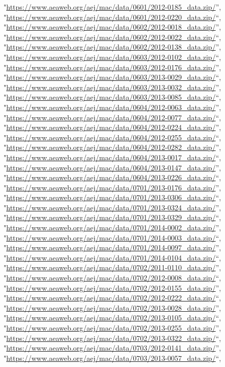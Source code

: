 \documentclass[]{article}
\begin{document}
\begin{itemize}
  "\url{https://www.aeaweb.org/aej/mac/data/0601/2012-0185_data.zip/}'',
  "\url{https://www.aeaweb.org/aej/mac/data/0601/2012-0220_data.zip/}``,
  "\url{https://www.aeaweb.org/aej/mac/data/0602/2012-0018_data.zip/}'',
  "\url{https://www.aeaweb.org/aej/mac/data/0602/2012-0022_data.zip/}``,
  "\url{https://www.aeaweb.org/aej/mac/data/0602/2012-0138_data.zip/}'',
  "\url{https://www.aeaweb.org/aej/mac/data/0603/2012-0102_data.zip/}``,
  "\url{https://www.aeaweb.org/aej/mac/data/0603/2012-0176_data.zip/}'',
  "\url{https://www.aeaweb.org/aej/mac/data/0603/2013-0029_data.zip/}``,
  "\url{https://www.aeaweb.org/aej/mac/data/0603/2013-0032_data.zip/}'',
  "\url{https://www.aeaweb.org/aej/mac/data/0603/2013-0085_data.zip/}``,
  "\url{https://www.aeaweb.org/aej/mac/data/0604/2012-0063_data.zip/}'',
  "\url{https://www.aeaweb.org/aej/mac/data/0604/2012-0077_data.zip/}``,
  "\url{https://www.aeaweb.org/aej/mac/data/0604/2012-0224_data.zip/}'',
  "\url{https://www.aeaweb.org/aej/mac/data/0604/2012-0255_data.zip/}``,
  "\url{https://www.aeaweb.org/aej/mac/data/0604/2012-0282_data.zip/}'',
  "\url{https://www.aeaweb.org/aej/mac/data/0604/2013-0017_data.zip/}``,
  "\url{https://www.aeaweb.org/aej/mac/data/0604/2013-0147_data.zip/}'',
  "\url{https://www.aeaweb.org/aej/mac/data/0604/2013-0226_data.zip/}``,
  "\url{https://www.aeaweb.org/aej/mac/data/0701/2013-0176_data.zip/}'',
  "\url{https://www.aeaweb.org/aej/mac/data/0701/2013-0306_data.zip/}``,
  "\url{https://www.aeaweb.org/aej/mac/data/0701/2013-0324_data.zip/}'',
  "\url{https://www.aeaweb.org/aej/mac/data/0701/2013-0329_data.zip/}``,
  "\url{https://www.aeaweb.org/aej/mac/data/0701/2014-0002_data.zip/}'',
  "\url{https://www.aeaweb.org/aej/mac/data/0701/2014-0003_data.zip/}``,
  "\url{https://www.aeaweb.org/aej/mac/data/0701/2014-0097_data.zip/}'',
  "\url{https://www.aeaweb.org/aej/mac/data/0701/2014-0104_data.zip/}``,
  "\url{https://www.aeaweb.org/aej/mac/data/0702/2011-0110_data.zip/}'',
  "\url{https://www.aeaweb.org/aej/mac/data/0702/2012-0008_data.zip/}``,
  "\url{https://www.aeaweb.org/aej/mac/data/0702/2012-0155_data.zip/}'',
  "\url{https://www.aeaweb.org/aej/mac/data/0702/2012-0222_data.zip/}``,
  "\url{https://www.aeaweb.org/aej/mac/data/0702/2013-0028_data.zip/}'',
  "\url{https://www.aeaweb.org/aej/mac/data/0702/2013-0105_data.zip/}``,
  "\url{https://www.aeaweb.org/aej/mac/data/0702/2013-0255_data.zip/}'',
  "\url{https://www.aeaweb.org/aej/mac/data/0702/2013-0322_data.zip/}``,
  "\url{https://www.aeaweb.org/aej/mac/data/0703/2012-0141_data.zip/}'',
  "\url{https://www.aeaweb.org/aej/mac/data/0703/2013-0057_data.zip/}``,

\end{itemize}
\end{document}
